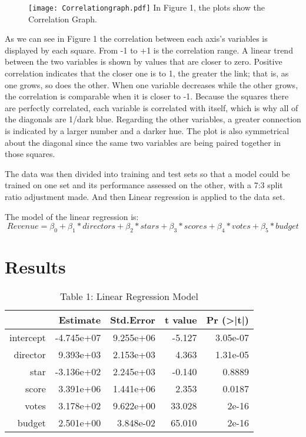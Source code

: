 \documentclass[12pt]{article}
\begin{document}
\begin{figure}
  \centering
	\texttt{[image: Correlationgraph.pdf]}
	\label{fig:Correlationgraph}
In Figure 1, the plots show the Correlation Graph.
\end{figure}

As we can see in Figure 1 the correlation between each axis’s variables is displayed by each square. From 
-1 to +1 is the correlation range. A linear trend between the two variables is shown
by values that are closer to zero. Positive correlation indicates that the closer one 
is to 1, the greater the link; that is, as one grows, so does the other. When one variable 
decreases while the other grows, the correlation is comparable when it is closer to -1.
Because the squares there are perfectly correlated, each variable is correlated with itself,
which is why all of the diagonals are 1/dark blue. Regarding the other variables, a greater 
connection is indicated by a larger number and a darker hue. The plot is also symmetrical
about the diagonal since the same two variables are being paired together in those squares.

The data was then divided into training and test sets so that a model could be 
trained on one set and its performance assessed on the other, with a 7:3 split 
ratio adjustment made. And then Linear regression is applied to 
the data set.

The model of the linear regression is:
\begin{equation}
 Revenue = \beta_0 + \beta_1 * directors + \beta_2 * stars + \beta_3 * scores + \beta_4 *votes + \beta_5* budget 
\end{equation}

\section{Results}
\label{sec:res}

\begin{table}[h]
\caption{Table 1: Linear Regression Model}
\centering
\begin{tabular}{rrrrr}
\hline
 & Estimate   & Std.Error & t value & Pr (\textgreater|t|) \\
 \hline
intercept & -4.745e+07 & 9.255e+06 & -5.127  & 3.05e-07 \\ 
director  & 9.393e+03  & 2.153e+03 & 4.363   & 1.31e-05 \\ 
star      & -3.136e+02 & 2.245e+03 & -0.140  & 0.8889 \\ 
score     & 3.391e+06  & 1.441e+06 & 2.353   & 0.0187 \\ 
votes     & 3.178e+02  & 9.622e+00 & 33.028  & 2e-16 \\ 
budget    & 2.501e+00  & 3.848e-02 & 65.010  & 2e-16 \\
\hline
\end{tabular}
\end{table}
\end{document}
